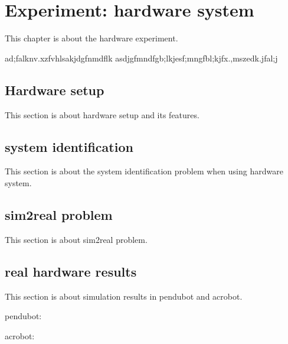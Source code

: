 \chapter{Experiment: hardware system}
This chapter is about the hardware experiment.

ad;falknv.xzfvhlsakjdgfnmdflk asdjgfmndfgb;lkjesf;mngfbl;kjfx.,mszedk.jfal;j

\section{Hardware setup}
This section is about hardware setup and its features.

\section{system identification}
This section is about the system identification problem when using hardware system.

\section{sim2real problem}
This section is about sim2real problem.

\section{real hardware results}
This section is about simulation results in pendubot and acrobot.

pendubot:

acrobot:

\cleardoublepage
